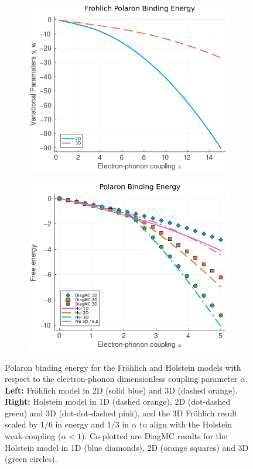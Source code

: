 \begin{figure}
  \begin{subfigure}[b]{0.49\textwidth}
    \includegraphics[width=\textwidth]{figures/energy_alpha_fro.png}
  \end{subfigure}
  \hfill
  \begin{subfigure}[b]{0.49\textwidth}
    \includegraphics[width=\textwidth]{figures/energy_alpha.png}
  \end{subfigure}
  \caption{Polaron binding energy for the Fr\"ohlich and Holstein models with respect to the electron-phonon dimensionless coupling parameter $\alpha$. \textbf{Left:} Fr\"ohlich model in 2D (solid blue) and 3D (dashed orange). \textbf{Right:} Holstein model in 1D (dashed orange), 2D (dot-dashed green) and 3D (dot-dot-dashed pink), and the 3D Fr\"ohlich result scaled by $1/6$ in energy and $1/3$ in $\alpha$ to align with the Holstein weak-coupling ($\alpha < 1$). Co-plotted are DiagMC results for the Holstein model in 1D (blue diamonds), 2D (orange squares) and 3D (green circles).}
  \label{fig:energy_alpha}
\end{figure}

